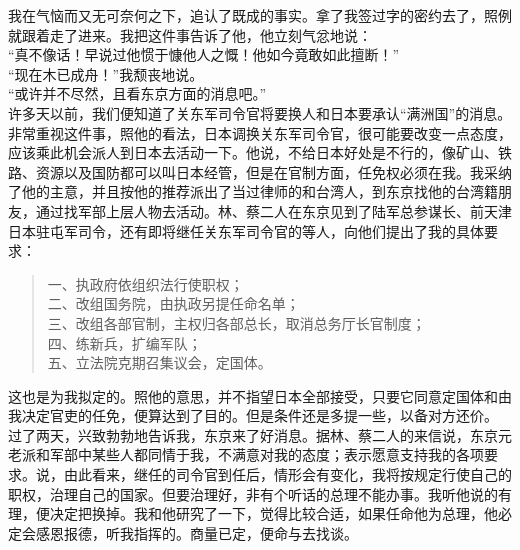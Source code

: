 我在气恼而又无可奈何之下，追认了既成的事实。拿了我签过字的密约去了，照例就跟着走了进来。我把这件事告诉了他，他立刻气忿地说：\\

“真不像话！早说过他惯于慷他人之慨！他如今竟敢如此擅断！”\\

“现在木已成舟！”我颓丧地说。\\

“或许并不尽然，且看东京方面的消息吧。”\\

许多天以前，我们便知道了关东军司令官将要换人和日本要承认“满洲国”的消息。非常重视这件事，照他的看法，日本调换关东军司令官，很可能要改变一点态度，应该乘此机会派人到日本去活动一下。他说，不给日本好处是不行的，像矿山、铁路、资源以及国防都可以叫日本经管，但是在官制方面，任免权必须在我。我采纳了他的主意，并且按他的推荐派出了当过律师的和台湾人，到东京找他的台湾籍朋友，通过找军部上层人物去活动。林、蔡二人在东京见到了陆军总参谋长、前天津日本驻屯军司令，还有即将继任关东军司令官的等人，向他们提出了我的具体要求：\\

\begin{quote}
	一、执政府依组织法行使职权；\\

二、改组国务院，由执政另提任命名单；\\

三、改组各部官制，主权归各部总长，取消总务厅长官制度；\\

四、练新兵，扩编军队；\\

五、立法院克期召集议会，定国体。\\
\end{quote}

这也是为我拟定的。照他的意思，并不指望日本全部接受，只要它同意定国体和由我决定官吏的任免，便算达到了目的。但是条件还是多提一些，以备对方还价。\\

过了两天，兴致勃勃地告诉我，东京来了好消息。据林、蔡二人的来信说，东京元老派和军部中某些人都同情于我，不满意对我的态度；表示愿意支持我的各项要求。说，由此看来，继任的司令官到任后，情形会有变化，我将按规定行使自己的职权，治理自己的国家。但要治理好，非有个听话的总理不能办事。我听他说的有理，便决定把换掉。我和他研究了一下，觉得比较合适，如果任命他为总理，他必定会感恩报德，听我指挥的。商量已定，便命与去找谈。\\

